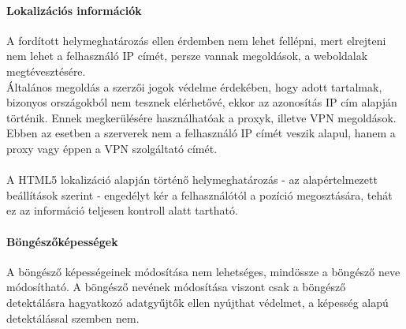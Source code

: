 \paragraph{Lokalizációs információk} %
\label{par:lokalizációs_információk_security}
A fordított helymeghatározás ellen érdemben nem lehet fellépni, mert elrejteni nem lehet a felhasználó IP címét, persze vannak megoldások, a weboldalak megtévesztésére.\hfill\\
Általános megoldás a szerzői jogok védelme érdekében, hogy adott tartalmak, bizonyos országokból nem tesznek elérhetővé, ekkor az azonosítás IP cím alapján történik. Ennek megkerülésére használhatóak a proxyk, illetve VPN megoldások. Ebben az esetben a szerverek nem a felhasználó IP címét veszik alapul, hanem a proxy vagy éppen a VPN szolgáltató címét.\hfill\\
\\
A HTML5 lokalizáció alapján történő helymeghatározás - az alapértelmezett beállítások szerint - engedélyt kér a felhasználótól a pozíció megosztására, tehát ez az információ teljesen kontroll alatt tartható.
\\
\paragraph{Böngészőképességek} %
\label{par:böngészőképességek}
A böngésző képességeinek módosítása nem lehetséges, mindössze a böngésző neve módosítható. A böngésző nevének módosítása viszont csak a böngésző detektálásra hagyatkozó adatgyűjtők ellen nyújthat védelmet, a képesség alapú detektálással szemben nem.
\\
